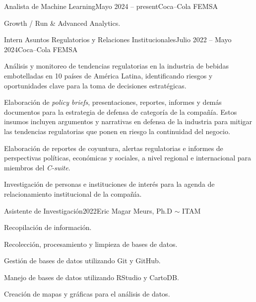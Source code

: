 \documentclass[letter]{resume}
\begin{document}
\begin{content}

\begin{position}{Analista de Machine Learning}{Mayo 2024 -- present}{Coca--Cola FEMSA}{}{}
  \item Growth / Run \& Advanced Analytics.
\end{position}

\begin{position}{Intern Asuntos Regulatorios y Relaciones Institucionales}{Julio 2022 -- Mayo 2024}{Coca--Cola FEMSA}{}{}
 \item Análisis y monitoreo de tendencias regulatorias en la industria de bebidas embotelladas en 10 países de América Latina, identificando riesgos y oportunidades clave para la toma de decisiones estratégicas.
 \item Elaboración de \emph{policy briefs}, presentaciones, reportes, informes y demás documentos para la estrategia de defensa de categoría de la compañía. Estos insumos incluyen argumentos y narrativas en defensa de la industria para mitigar las tendencias regulatorias que ponen en riesgo la continuidad del negocio.
 \item Elaboración de reportes de coyuntura, alertas regulatorias e informes de perspectivas políticas, económicas y sociales, a nivel regional e internacional para miembros del \emph{C-suite}.
 \item Investigación de personas e instituciones de interés para la agenda de relacionamiento institucional de la compañía.
\end{position}

\begin{position}{Asistente de Investigación}{2022}{Eric Magar Meurs, Ph.D $\sim$ ITAM}{}{}
 \item Recopilación de información.
 \item Recolección, procesamiento y limpieza de bases de datos.
 \item Gestión de bases de datos utilizando Git y GitHub.
 \item Manejo de bases de datos utilizando RStudio y CartoDB.
 \item Creación de mapas y gráficas para el análisis de datos.
\end{position}
\vspace{-.1 \baselineskip}

\sectionlineskip
\end{content}
\end{document}
